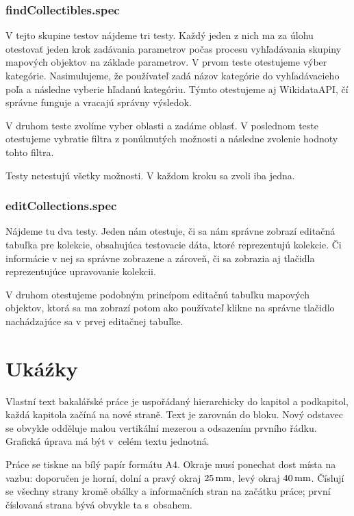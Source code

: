 \subsection*{findCollectibles.spec}
V tejto skupine testov nájdeme tri testy. Každý jeden z nich ma za úlohu otestovať jeden krok zadávania parametrov počas procesu vyhľadávania skupiny mapových objektov na základe parametrov. 
V prvom teste otestujeme výber kategórie. Nasimulujeme, že používateľ zadá názov kategórie do vyhľadávacieho poľa a následne vyberie hľadanú kategóriu. 
Týmto otestujeme aj WikidataAPI, čí správne funguje a vracajú správny výsledok. 

V druhom teste zvolíme vyber oblasti a zadáme oblasť. V poslednom teste otestujeme vybratie filtra z ponúknutých možnosti a následne zvolenie hodnoty tohto filtra. 

Testy netestujú všetky možnosti. V každom kroku sa zvoli iba jedna. 

\subsection*{editCollections.spec}
Nájdeme tu dva testy. Jeden nám otestuje, či sa nám správne zobrazí editačná tabuľka pre kolekcie, obsahujúca testovacie dáta, ktoré reprezentujú kolekcie. 
Či informácie v nej sa správne zobrazene a zároveň, či sa zobrazia aj tlačidla reprezentujúce upravovanie kolekcii. 

V druhom otestujeme podobným princípom editačnú tabuľku mapových objektov, ktorá sa ma zobrazí potom ako používateľ klikne na správne tlačidlo nachádzajúce sa v prvej editačnej tabuľke. 

\chapter{Ukáźky}
Vlastní text bakalářské práce je uspořádaný hierarchicky do kapitol a podkapitol,
každá kapitola začíná na nové straně. Text je zarovnán do bloku. Nový odstavec
se obvykle odděluje malou vertikální mezerou a odsazením prvního řádku. Grafická
úprava má být v~celém textu jednotná.

Práce se tiskne na bílý papír formátu A4. Okraje musí ponechat dost místa na vazbu:
doporučen je horní, dolní a pravý okraj $25\,\rm mm$, levý okraj $40\,\rm mm$.
Číslují se všechny strany kromě obálky a informačních stran na začátku práce;
první číslovaná strana bývá obvykle ta s~obsahem.

